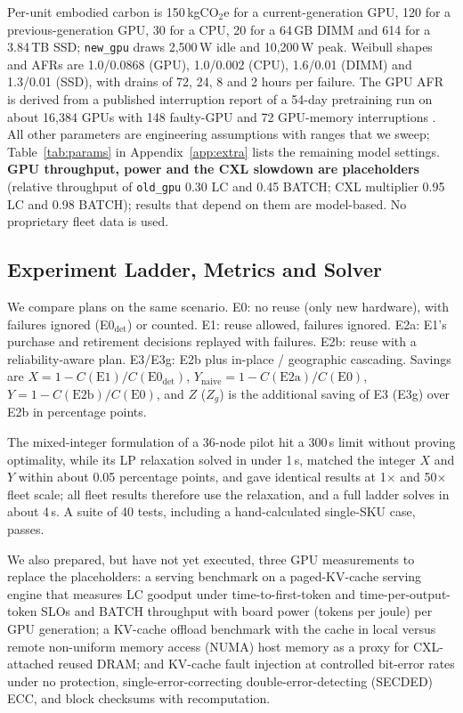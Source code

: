 \documentclass[11pt]{article}
\begin{document}
Per-unit embodied carbon is 150\,kgCO$_2$e for a current-generation GPU, 120 for a previous-generation GPU, 30 for a CPU, 20 for a 64\,GB DIMM and 614 for a 3.84\,TB SSD; \texttt{new\_gpu} draws 2{,}500\,W idle and 10{,}200\,W peak. Weibull shapes and AFRs are 1.0/0.0868 (GPU), 1.0/0.002 (CPU), 1.6/0.01 (DIMM) and 1.3/0.01 (SSD), with drains of 72, 24, 8 and 2 hours per failure. The GPU AFR is derived from a published interruption report of a 54-day pretraining run on about 16{,}384 GPUs with 148 faulty-GPU and 72 GPU-memory interruptions \citep{llama3}. All other parameters are engineering assumptions with ranges that we sweep; Table~\ref{tab:params} in Appendix~\ref{app:extra} lists the remaining model settings. \textbf{GPU throughput, power and the CXL slowdown are placeholders} (relative throughput of \texttt{old\_gpu} 0.30 LC and 0.45 BATCH; CXL multiplier 0.95 LC and 0.98 BATCH); results that depend on them are model-based. No proprietary fleet data is used.

\subsection{Experiment Ladder, Metrics and Solver}
We compare plans on the same scenario. E0: no reuse (only new hardware), with failures ignored (E0$_\text{det}$) or counted. E1: reuse allowed, failures ignored. E2a: E1's purchase and retirement decisions replayed with failures. E2b: reuse with a reliability-aware plan. E3/E3g: E2b plus in-place / geographic cascading. Savings are $X=1-C(\text{E1})/C(\text{E0}_\text{det})$, $Y_\text{naive}=1-C(\text{E2a})/C(\text{E0})$, $Y=1-C(\text{E2b})/C(\text{E0})$, and $Z$ ($Z_g$) is the additional saving of E3 (E3g) over E2b in percentage points.

The mixed-integer formulation of a 36-node pilot hit a 300\,s limit without proving optimality, while its LP relaxation solved in under 1\,s, matched the integer $X$ and $Y$ within about 0.05 percentage points, and gave identical results at 1$\times$ and 50$\times$ fleet scale; all fleet results therefore use the relaxation, and a full ladder solves in about 4\,s. A suite of 40 tests, including a hand-calculated single-SKU case, passes.

We also prepared, but have not yet executed, three GPU measurements to replace the placeholders: a serving benchmark on a paged-KV-cache serving engine \citep{kwon2023vllm} that measures LC goodput under time-to-first-token and time-per-output-token SLOs and BATCH throughput with board power (tokens per joule) per GPU generation; a KV-cache offload benchmark with the cache in local versus remote non-uniform memory access (NUMA) host memory as a proxy for CXL-attached reused DRAM; and KV-cache fault injection at controlled bit-error rates under no protection, single-error-correcting double-error-detecting (SECDED) ECC, and block checksums with recomputation.
\end{document}
